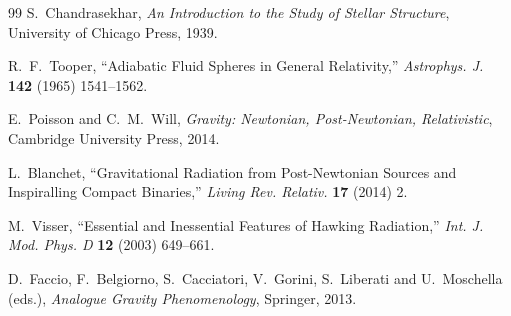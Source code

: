 \documentclass[11pt]{article}
\begin{document}
\begin{thebibliography}{99}
S.~Chandrasekhar,
\textit{An Introduction to the Study of Stellar Structure},
University of Chicago Press, 1939.

R.~F.~Tooper,
``Adiabatic Fluid Spheres in General Relativity,''
\textit{Astrophys. J.} \textbf{142} (1965) 1541–1562.

E.~Poisson and C.~M.~Will,
\textit{Gravity: Newtonian, Post-Newtonian, Relativistic},
Cambridge University Press, 2014.

L.~Blanchet,
``Gravitational Radiation from Post-Newtonian Sources and Inspiralling Compact Binaries,''
\textit{Living Rev. Relativ.} \textbf{17} (2014) 2.

M.~Visser,
``Essential and Inessential Features of Hawking Radiation,''
\textit{Int. J. Mod. Phys. D} \textbf{12} (2003) 649–661.

D.~Faccio, F.~Belgiorno, S.~Cacciatori, V.~Gorini, S.~Liberati and U.~Moschella (eds.),
\textit{Analogue Gravity Phenomenology},
Springer, 2013.

\end{thebibliography}
\end{document}
